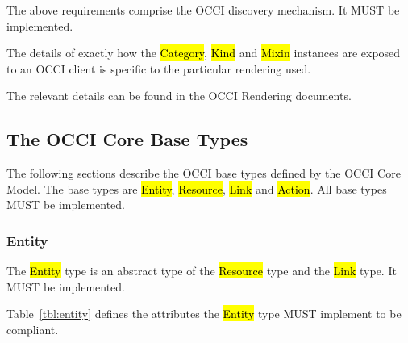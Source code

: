 \documentclass[10pt,a4paper]{article}
\begin{document}
The above requirements comprise the OCCI discovery mechanism. It MUST
be implemented.

The details of exactly how the \hl{Category}, \hl{Kind} and \hl{Mixin}
instances are exposed to an OCCI client is specific to the particular
rendering used.

The relevant details can be found in the OCCI Rendering documents.

\subsection{The OCCI Core Base Types}
\label{sec:base_types}
The following sections describe the OCCI base types defined by the
OCCI Core Model.  The base types are \hl{Entity}, \hl{Resource},
\hl{Link} and \hl{Action}. All base types MUST be implemented.

\subsubsection{Entity}
\label{sec:entity}
The \hl{Entity} type is an abstract type of the \hl{Resource} type and
the \hl{Link} type. It MUST be implemented.

Table~\ref{tbl:entity} defines the attributes the \hl{Entity} type
MUST implement to be compliant.

\end{document}
